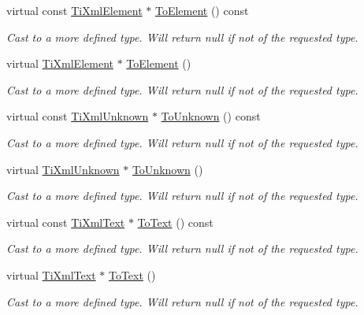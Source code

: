 \begin{DoxyCompactItemize}
virtual const \hyperlink{classTiXmlElement}{TiXmlElement} $\ast$ \hyperlink{classTiXmlNode_a72abed96dc9667ab9e0a2a275301bb1c}{ToElement} () const 
\begin{DoxyCompactList}\small\item\em Cast to a more defined type. Will return null if not of the requested type. \item\end{DoxyCompactList}\item 
virtual \hyperlink{classTiXmlElement}{TiXmlElement} $\ast$ \hyperlink{classTiXmlNode_aa65d000223187d22a4dcebd7479e9ebc}{ToElement} ()
\begin{DoxyCompactList}\small\item\em Cast to a more defined type. Will return null if not of the requested type. \item\end{DoxyCompactList}\item 
virtual const \hyperlink{classTiXmlUnknown}{TiXmlUnknown} $\ast$ \hyperlink{classTiXmlNode_afd7205cf31d7a376929f8a36930627a2}{ToUnknown} () const 
\begin{DoxyCompactList}\small\item\em Cast to a more defined type. Will return null if not of the requested type. \item\end{DoxyCompactList}\item 
virtual \hyperlink{classTiXmlUnknown}{TiXmlUnknown} $\ast$ \hyperlink{classTiXmlNode_a06de5af852668c7e4af0d09c205f0b0d}{ToUnknown} ()
\begin{DoxyCompactList}\small\item\em Cast to a more defined type. Will return null if not of the requested type. \item\end{DoxyCompactList}\item 
virtual const \hyperlink{classTiXmlText}{TiXmlText} $\ast$ \hyperlink{classTiXmlNode_a95a46a52c525992d6b4ee08beb14cd69}{ToText} () const 
\begin{DoxyCompactList}\small\item\em Cast to a more defined type. Will return null if not of the requested type. \item\end{DoxyCompactList}\item 
virtual \hyperlink{classTiXmlText}{TiXmlText} $\ast$ \hyperlink{classTiXmlNode_a3ddfbcac78fbea041fad57e5c6d60a03}{ToText} ()
\begin{DoxyCompactList}\small\item\em Cast to a more defined type. Will return null if not of the requested type. \item\end{DoxyCompactList}\item 

\end{DoxyCompactItemize}
